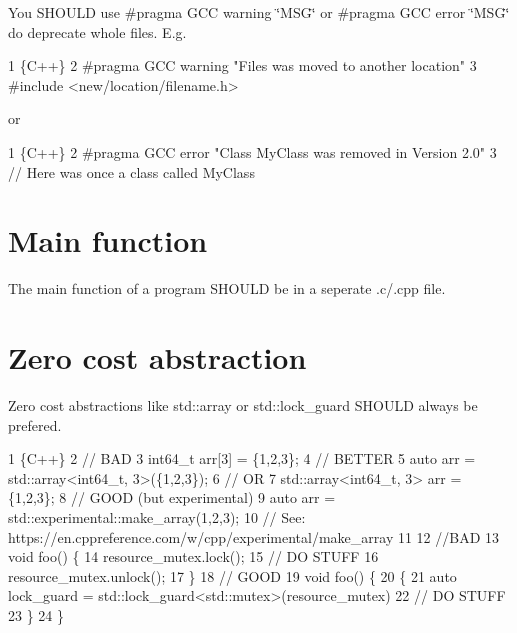 You S\+H\+O\+U\+LD use {\ttfamily \#pragma G\+CC warning \char`\"{}\+M\+S\+G\char`\"{}} or {\ttfamily \#pragma G\+CC error \char`\"{}\+M\+S\+G\char`\"{}} do deprecate whole files. E.\+g. 
\begin{DoxyCode}
1 \{C++\}
2 #pragma GCC warning "Files was moved to another location"
3 #include <new/location/filename.h>
\end{DoxyCode}
 or 
\begin{DoxyCode}
1 \{C++\}
2 #pragma GCC error "Class MyClass was removed in Version 2.0"
3 // Here was once a class called MyClass
\end{DoxyCode}


\section*{Main function}

The {\ttfamily main} function of a program S\+H\+O\+U\+LD be in a seperate {\ttfamily .c}/{\ttfamily .cpp} file.

\section*{Zero cost abstraction}

Zero cost abstractions like {\ttfamily std\+::array} or {\ttfamily std\+::lock\+\_\+guard} S\+H\+O\+U\+LD always be prefered. 
\begin{DoxyCode}
1 \{C++\}
2 // BAD
3 int64\_t arr[3] = \{1,2,3\};
4 // BETTER
5 auto arr = std::array<int64\_t, 3>(\{1,2,3\});
6 // OR
7 std::array<int64\_t, 3> arr = \{1,2,3\};
8 // GOOD (but experimental)
9 auto arr = std::experimental::make\_array(1,2,3);
10 // See: https://en.cppreference.com/w/cpp/experimental/make\_array
11 
12 //BAD
13 void foo() \{
14     resource\_mutex.lock();
15     // DO STUFF
16     resource\_mutex.unlock();
17 \}
18 // GOOD
19 void foo() \{
20     \{
21         auto lock\_guard = std::lock\_guard<std::mutex>(resource\_mutex)
22         // DO STUFF
23     \}
24 \}
\end{DoxyCode}
 